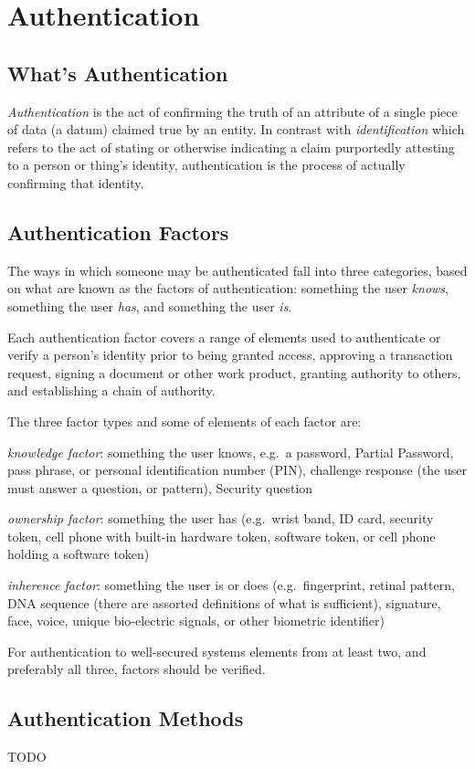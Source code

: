 
\section{Authentication}

\subsection{What's Authentication}

\emph{Authentication} is the act of confirming the truth of an attribute
of a single piece of data (a datum) claimed true by an entity. In
contrast with \emph{identification} which refers to the act of stating
or otherwise indicating a claim purportedly attesting to a person or
thing's identity, authentication is the process of actually confirming
that identity.


\subsection{Authentication Factors}

The ways in which someone may be authenticated fall into three
categories, based on what are known as the factors of authentication:
something the user \emph{knows}, something the user \emph{has}, and
something the user \emph{is}.

Each authentication factor covers a range of elements used to
authenticate or verify a person's identity prior to being granted
access, approving a transaction request, signing a document or other
work product, granting authority to others, and establishing a chain of
authority.


The three factor types and some of elements of each factor are:

\begin{description}

    \item \emph{knowledge factor}: something the user knows, e.g.\ a 
        password, Partial Password, pass phrase, or personal identification 
        number (PIN), challenge response (the user must answer a question, 
        or pattern), Security question

    \item \emph{ownership factor}: something the user has (e.g.\ wrist band, 
        ID card, security token, cell phone with built-in hardware token, 
        software token, or cell phone holding a software token)

    \item \emph{inherence factor}: something the user is or does (e.g.\ 
        fingerprint, retinal pattern, DNA sequence (there are assorted 
        definitions of what is sufficient), signature, face, voice, 
        unique bio-electric signals, or other biometric identifier)

\end{description}


For authentication to well-secured systems elements from at least two,
and preferably all three, factors should be verified.


\subsection{Authentication Methods}

TODO


